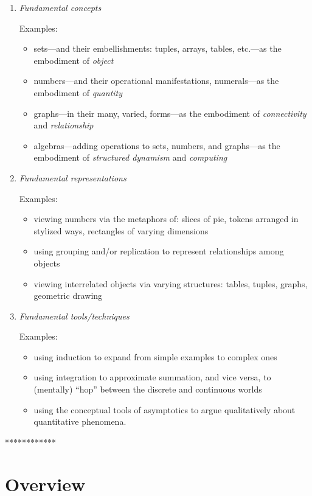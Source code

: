 \begin{enumerate}
\item
{\it Fundamental concepts}

{\sf Examples:}
\begin{itemize}
\item
sets---and their embellishments: tuples, arrays, tables, etc.---as the
embodiment of {\it object}
\item
numbers---and their operational manifestations, numerals---as the
embodiment of {\it quantity}
\item
graphs---in their many, varied, forms---as the embodiment of {\it
  connectivity} and {\it relationship}
\item
algebras---adding operations to sets, numbers, and graphs---as the
embodiment of {\it structured dynamism} and {\it computing}
\end{itemize}

\item
{\it Fundamental representations}

{\sf Examples:}
\begin{itemize}
\item
viewing numbers via the metaphors of: slices of pie, tokens arranged in
stylized ways, rectangles of varying dimensions
\item
using grouping and/or replication to represent relationships among
objects
\item
viewing interrelated objects via varying structures: tables, tuples,
graphs, geometric drawing
\end{itemize}

\item
{\it Fundamental tools/techniques}

{\sf Examples:}
\begin{itemize}
\item
using induction to expand from simple examples to complex ones
\item
using integration to approximate summation, and vice versa, to
(mentally) ``hop'' between the discrete and continuous worlds
\item
using the conceptual tools of asymptotics to argue qualitatively about
quantitative phenomena.
\end{itemize}
\end{enumerate}

************


\section{Overview}
\label{sec:overview}

